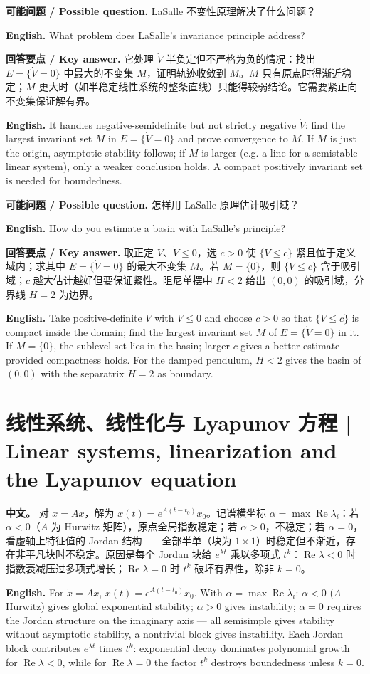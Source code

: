 \documentclass[UTF8,11pt,a4paper]{ctexart}
\newcommand{\EN}[1]{\par\noindent\textbf{English.} #1\par}
\newcommand{\ASK}[4]{\begin{samepage}\par\noindent\textbf{可能问题 / Possible question.} #1\par\EN{#2}\noindent\textbf{回答要点 / Key answer.} #3\par\EN{#4}\smallskip\end{samepage}}
\newcommand{\APS}[2]{\par\noindent\textbf{中文。} #1\par\noindent\textbf{English.} #2\par}
\begin{document}
\ASK{LaSalle 不变性原理解决了什么问题？}{What problem does LaSalle's invariance principle address?}{它处理 $\dot V$ 半负定但不严格为负的情况：找出 $E=\{\dot V=0\}$ 中最大的不变集 $M$，证明轨迹收敛到 $M$。$M$ 只有原点时得渐近稳定；$M$ 更大时（如半稳定线性系统的整条直线）只能得较弱结论。它需要紧正向不变集保证解有界。}{It handles negative-semidefinite but not strictly negative $\dot V$: find the largest invariant set $M$ in $E=\{\dot V=0\}$ and prove convergence to $M$. If $M$ is just the origin, asymptotic stability follows; if $M$ is larger (e.g. a line for a semistable linear system), only a weaker conclusion holds. A compact positively invariant set is needed for boundedness.}

\ASK{怎样用 LaSalle 原理估计吸引域？}{How do you estimate a basin with LaSalle's principle?}{取正定 $V$、$\dot V\le0$，选 $c>0$ 使 $\{V\le c\}$ 紧且位于定义域内；求其中 $E=\{\dot V=0\}$ 的最大不变集 $M$。若 $M=\{0\}$，则 $\{V\le c\}$ 含于吸引域；$c$ 越大估计越好但要保证紧性。阻尼单摆中 $H<2$ 给出 $(0,0)$ 的吸引域，分界线 $H=2$ 为边界。}{Take positive-definite $V$ with $\dot V\le0$ and choose $c>0$ so that $\{V\le c\}$ is compact inside the domain; find the largest invariant set $M$ of $E=\{\dot V=0\}$ in it. If $M=\{0\}$, the sublevel set lies in the basin; larger $c$ gives a better estimate provided compactness holds. For the damped pendulum, $H<2$ gives the basin of $(0,0)$ with the separatrix $H=2$ as boundary.}

\section{线性系统、线性化与 Lyapunov 方程 | Linear systems, linearization and the Lyapunov equation}
\APS{对 $\dot x=Ax$，解为 $x(t)=e^{A(t-t_0)}x_0$。记谱横坐标 $\alpha=\max\operatorname{Re}\lambda_i$：若 $\alpha<0$（$A$ 为 Hurwitz 矩阵），原点全局指数稳定；若 $\alpha>0$，不稳定；若 $\alpha=0$，看虚轴上特征值的 Jordan 结构——全部半单（块为 $1\times1$）时稳定但不渐近，存在非平凡块时不稳定。原因是每个 Jordan 块给 $e^{\lambda t}$ 乘以多项式 $t^k$：$\operatorname{Re}\lambda<0$ 时指数衰减压过多项式增长；$\operatorname{Re}\lambda=0$ 时 $t^k$ 破坏有界性，除非 $k=0$。}{For $\dot x=Ax$, $x(t)=e^{A(t-t_0)}x_0$. With $\alpha=\max\operatorname{Re}\lambda_i$: $\alpha<0$ ($A$ Hurwitz) gives global exponential stability; $\alpha>0$ gives instability; $\alpha=0$ requires the Jordan structure on the imaginary axis — all semisimple gives stability without asymptotic stability, a nontrivial block gives instability. Each Jordan block contributes $e^{\lambda t}$ times $t^k$: exponential decay dominates polynomial growth for $\operatorname{Re}\lambda<0$, while for $\operatorname{Re}\lambda=0$ the factor $t^k$ destroys boundedness unless $k=0$.}
\end{document}
